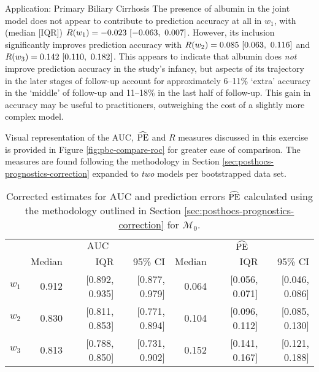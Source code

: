 \begin{chapter}{\label{cha:app-PBC}Application: Primary Biliary Cirrhosis}
  The presence of albumin in the joint model does not appear to contribute to prediction accuracy at all in $w_1$, with (median [IQR]) $R\lb w_1\rb=-0.023\ [-0.063,\ 0.007]$. However, its inclusion significantly improves prediction accuracy with $R\lb w_2\rb=0.085\ [0.063,\ 0.116]$ and $R\!\left( w_3\right)= 0.142\ [0.110,\ 0.182]$. This appears to indicate that albumin does \textit{not} improve prediction accuracy in the study's infancy, but aspects of its trajectory in the later stages of follow-up account for approximately 6--11\% `extra' accuracy in the `middle' of follow-up and 11--18\% in the last half of follow-up. This gain in accuracy may be useful to practitioners, outweighing the cost of a slightly more complex model.

  Visual representation of the $\mathrm{AUC}$, $\widehat{\mathrm{PE}}$ and $R$ measures discussed in this exercise is provided in Figure \ref{fig:pbc-compare-roc} for greater ease of comparison. The measures are found following the methodology in Section \ref{sec:posthocs-prognostics-correction} expanded to \textit{two} models per bootstrapped data set. 

  \begin{table}[ht]
      \centering
      \captionsetup{font=scriptsize}
      \begin{tabular}{c|rrr:rrr}
        &  & \\
        & Median & IQR & 95\% CI & Median & IQR & 95\% CI\\
        \hline
        $w_1$  & 0.912 & [0.892, 0.935] & [0.877, 0.979] & 0.064 & [0.056, 0.071] & [0.046, 0.086] \\
        $w_2$  & 0.830 & [0.811, 0.853] & [0.771, 0.894] & 0.104 & [0.096, 0.112] & [0.085, 0.130] \\
        $w_3$  & 0.813 & [0.788, 0.850] & [0.731, 0.902] & 0.152 & [0.141, 0.167] & [0.121, 0.188] \\
        \hline
      \end{tabular}
      \caption{Corrected estimates for $\mathrm{AUC}$ and prediction errors $\widehat{\mathrm{PE}}$ calculated using the methodology outlined in Section \ref{sec:posthocs-prognostics-correction} for $\mathcal{M}_0$.}
      \label{tab:pbc-auc-PE-M0}
  \end{table}


\end{chapter}
